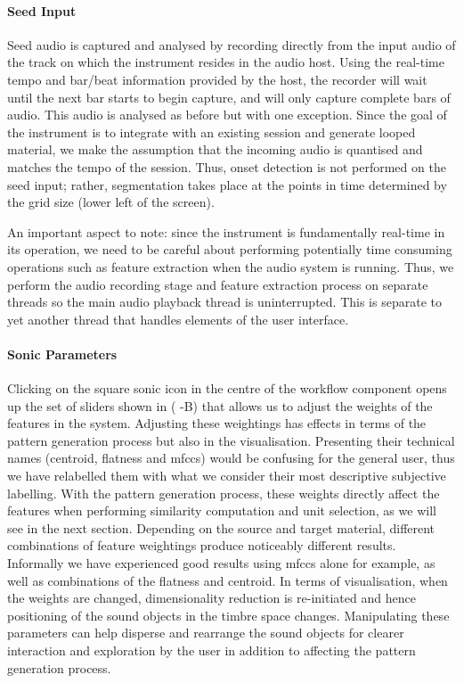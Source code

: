 \paragraph{Seed Input}

Seed audio is captured and analysed by recording directly from the input audio of the track on which the instrument resides in the audio host. Using the real-time tempo and bar/beat information provided by the host, the recorder will wait until the next bar starts to begin capture, and will only capture complete bars of audio. This audio is analysed as before but with one exception. Since the goal of the instrument is to integrate with an existing session and generate looped material, we make the assumption that the incoming audio is quantised and matches the tempo of the session. Thus, onset detection is not performed on the seed input; rather, segmentation takes place at the points in time determined by the grid size (lower left of the screen).

An important aspect to note: since the instrument is fundamentally real-time in its operation, we need to be careful about performing potentially time consuming operations such as feature extraction when the audio system is running. Thus, we perform the audio recording stage and feature extraction process on separate threads so the main audio playback thread is uninterrupted. This is separate to yet another thread that handles elements of the user interface.

\paragraph{Sonic Parameters}

Clicking on the square sonic icon in the centre of the workflow component opens up the set of sliders shown in ( -B) that allows us to adjust the weights of the features in the system. Adjusting these weightings has effects in terms of the pattern generation process but also in the visualisation. Presenting their technical names (centroid, flatness and \acrshort{mfcc}s) would be confusing for the general user, thus we have relabelled them with what we consider their most descriptive subjective labelling. With the pattern generation process, these weights directly affect the features when performing similarity computation and unit selection, as we will see in the next section. Depending on the source and target material, different combinations of feature weightings produce noticeably different results. Informally we have experienced good results using \acrshort{mfcc}s alone for example, as well as combinations of the flatness and centroid. In terms of visualisation, when the weights are changed, dimensionality reduction is re-initiated and hence positioning of the sound objects in the timbre space changes. Manipulating these parameters can help disperse and rearrange the sound objects for clearer interaction and exploration by the user in addition to affecting the pattern generation process.

